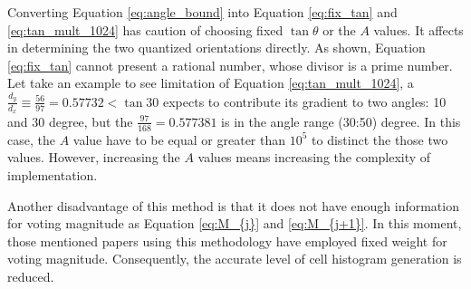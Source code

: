 Converting Equation \ref{eq:angle_bound} into Equation \ref{eq:fix_tan}  and
\ref{eq:tan_mult_1024} has  caution  of choosing fixed $\tan\theta$ or
the $A$ values.
It affects in determining the two quantized orientations directly.
As shown, Equation \ref{eq:fix_tan} cannot present a rational number, whose divisor is a
prime number.
Let take an example to see limitation of Equation \ref{eq:tan_mult_1024}, a
$\frac{d_y}{d_x} \equiv \frac{56}{97} = 0.57732 < \tan30$
expects to contribute its gradient to two angles: 10 and 30 degree, but the
$\frac{97}{168} = 0.577381$ is in the angle range (30:50) degree.
In this case, the $A$ value have to be equal or greater than  $10^5$ to distinct
the those two values.
However, increasing the $A$ values means increasing the complexity of
implementation. 

Another disadvantage of this method is that it does not have enough information for
voting magnitude as Equation \ref{eq:M_{j}} and \ref{eq:M_{j+1}}.  
In this moment, those mentioned papers using this methodology have employed fixed weight for voting magnitude.
Consequently, the accurate level of cell histogram generation is reduced.


